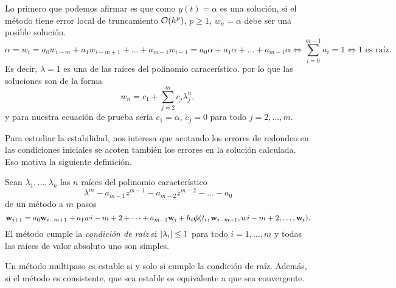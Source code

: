 Lo primero que podemos afirmar es que como $y(t) = \alpha$ es una solución,
si el método tiene error local de truncamiento $\vb{\mathcal{O}}{}(h^p)$, $p \ge 1$,
$w_n = \alpha$ debe ser una posible solución.
\begin{equation*}
    \alpha = w_i =
    a_0w_{i-m} + a_1w_{i-m+1} + \dots + a_{m-1}w_{i-1} =
    a_0\alpha + a_1\alpha + \dots + a_{m-1}\alpha \iff
    \sum_{i = 0}^{m-1} a_i = 1 \iff
    \text{$1$ es raíz.}
\end{equation*}
Es decir, $\lambda = 1$ es una de las raíces del polinomio caracerístico.
por lo que las soluciones son de la forma
\begin{equation*}
    w_n = c_1 + \sum_{j=2}^m c_j\lambda_j^n,
\end{equation*}
y para nuestra ecuación de prueba sería $c_1 = \alpha$,
$c_j = 0$ para todo $j = 2,\ldots,m$.

Para estudiar la estabilidad,
nos interesa que acotando los errores de redondeo en las condiciones iniciales
se acoten también los errores en la solución calculada.
Eso motiva la siguiente definición.

\begin{definition}
    Sean $\lambda_1,\ldots,\lambda_n$ las $n$ raíces del
    polinomio característico
    \begin{equation*}
        \lambda^m - a_{m-1}z^{m-1} - a_{m-2}z^{m-2} - \dots - a_0
    \end{equation*}
    de un método a $m$ pasos
    \begin{equation}\label{eqn:multistep}
        \vb{w}{}_{i+1} = a_0\vb{w}{}_{i-m+1} + a_1w{i-m+2} + \dots + a_{m-1}\vb{w}{}_i
            + h_i\vb*{\phi}{}(t_i,\vb{w}{}_{i-m+1},w{i-m+2},\dots,\vb{w}{}_i).
    \end{equation}
    El método cumple la \emph{condición de raíz} si
    $\abs{\lambda_i} \le 1$ para todo $i = 1,\ldots, m$
    y todas las raíces de valor absoluto uno son simples.
\end{definition}

\begin{theorem}
    Un método multipaso es estable si y solo si cumple la condición de raíz.
    Además, si el método es consistente,
    que sea estable es equivalente a que sea convergente.
\end{theorem}

